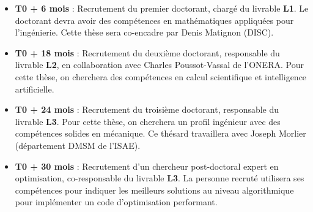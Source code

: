 \documentclass[12pt, french]{article}
\begin{document}
	\begin{itemize}
		\item \textbf{T0 + 6 mois} : Recrutement du premier doctorant, chargé du livrable \textbf{L1}. Le doctorant devra avoir des compétences en mathématiques appliquées pour l'ingénierie. Cette thèse sera co-encadre par Denis Matignon (DISC).
		\item \textbf{T0 + 18 mois} : Recrutement du deuxième doctorant, responsable du livrable \textbf{L2}, en collaboration avec Charles Poussot-Vassal de l'ONERA. Pour cette thèse, on cherchera des compétences en calcul scientifique et intelligence artificielle.
		\item \textbf{T0 + 24 mois} : Recrutement du troisième doctorant, responsable du livrable \textbf{L3}. Pour cette thèse, on cherchera un profil ingénieur avec des compétences solides en mécanique. Ce thésard travaillera avec Joseph Morlier (département DMSM de l'ISAE).
		\item \textbf{T0 + 30 mois} : Recrutement d'un chercheur post-doctoral expert en optimisation, co-responsable du livrable \textbf{L3}. La personne recruté utilisera ses compétences pour indiquer les meilleurs solutions au niveau algorithmique pour implémenter un code d'optimisation performant.
	\end{itemize}
	
\end{document}
